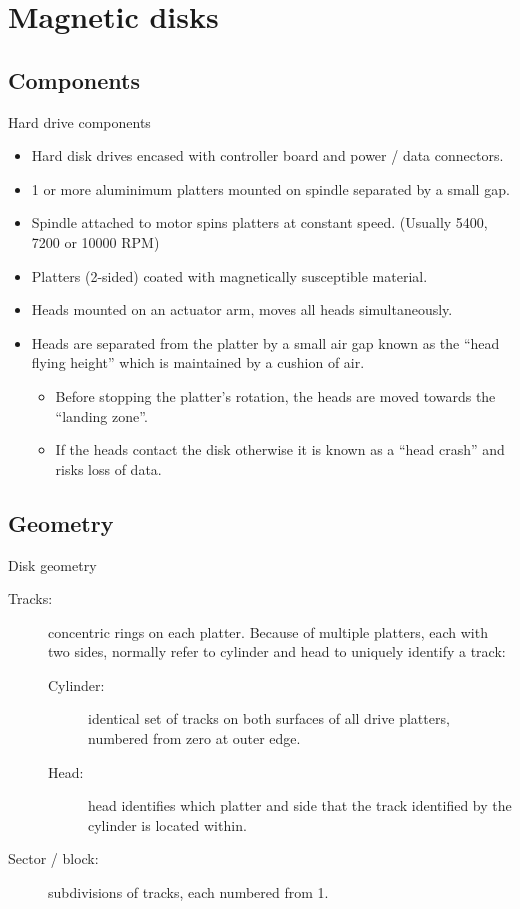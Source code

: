 \chapter{Magnetic disks}
\label{ch:magnetic-disks}

\section{Components}
\label{sec:components}


Hard drive components

\begin{itemize}
\item
  Hard disk drives encased with controller board and power / data
  connectors.
\item
  1 or more aluminimum platters mounted on spindle separated by a small
  gap.
\item
  Spindle attached to motor spins platters at constant speed. (Usually
  5400, 7200 or 10000 RPM)
\item
  Platters (2-sided) coated with magnetically susceptible material.
\item
  Heads mounted on an actuator arm, moves all heads simultaneously.
\item
  Heads are separated from the platter by a small air gap known as the
  ``head flying height'' which is maintained by a cushion of air.

  \begin{itemize}
  \item
    Before stopping the platter's rotation, the heads are moved towards
    the ``landing zone''.
  \item
    If the heads contact the disk otherwise it is known as a ``head
    crash'' and risks loss of data.
  \end{itemize}
\end{itemize}

\section{Geometry}\label{geometry}


Disk geometry

\begin{description}
\item[Tracks:]
concentric rings on each platter. Because of multiple platters, each
with two sides, normally refer to cylinder and head to uniquely identify
a track:

\begin{description}
\item[Cylinder:]
identical set of tracks on both surfaces of all drive platters, numbered
from zero at outer edge.
\item[Head:]
head identifies which platter and side that the track identified by the
cylinder is located within.
\end{description}
\item[Sector / block:]
subdivisions of tracks, each numbered from 1.
\end{description}


